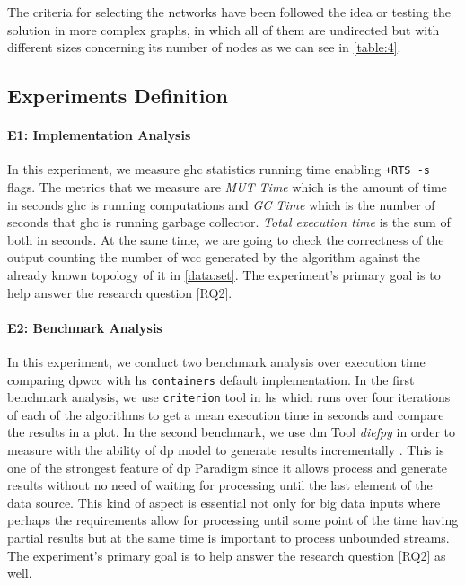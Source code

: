  The criteria for selecting the networks have been followed the idea or testing the solution in more complex graphs, in which all of them are undirected but with different sizes concerning its number of nodes as we can see in  \autoref{table:4}. 

\subsection{Experiments Definition}\label{sub:exp:def}
\paragraph{E1: Implementation Analysis}
In this experiment, we measure \acrshort{ghc} statistics running time enabling \texttt{+RTS -s} flags. The metrics that we measure are \emph{MUT Time} which is the amount of time in seconds \acrshort{ghc} is running computations and \emph{GC Time} which is the number of seconds that \acrshort{ghc} is running garbage collector. \emph{Total execution time} is the sum of both in seconds. At the same time, we are going to check the correctness of the output counting the number of \acrshort{wcc} generated by the algorithm against the already known topology of it in \autoref{data:set}. The experiment's primary goal is to help answer the research question [RQ2].

\paragraph{E2: Benchmark Analysis}
In this experiment, we conduct two benchmark analysis over execution time comparing \acrshort{dpwcc} with \acrshort{hs} \texttt{containers} default implementation. In the first benchmark analysis, we use \texttt{criterion} \cite{criterion} tool in \acrshort{hs} which runs over four iterations of each of the algorithms to get a mean execution time in seconds and compare the results in a plot. In the second benchmark, we use \acrfull{dm} Tool \emph{diefpy} \cite{diefpy} in order to measure with the ability of \acrshort{dp} model to generate results incrementally \cite{diefpaper}. This is one of the strongest feature of \acrshort{dp} Paradigm since it allows process and generate results without no need of waiting for processing until the last element of the data source. This kind of aspect is essential not only for big data inputs where perhaps the requirements allow for processing until some point of the time having partial results but at the same time is important to process unbounded streams. The experiment's primary goal is to help answer the research question [RQ2] as well.

